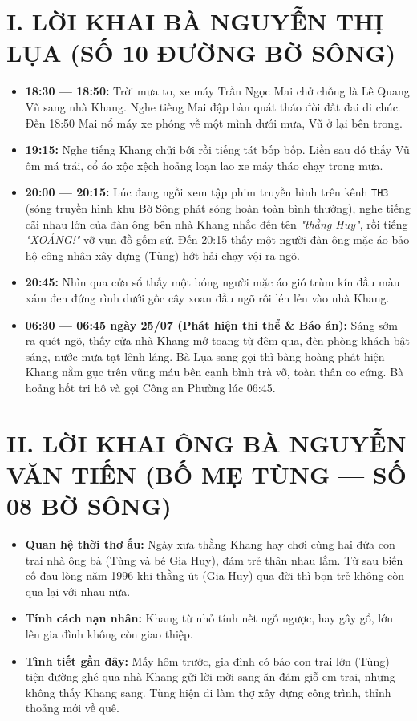 \documentclass[12pt,a4paper]{article}
\begin{document}
\section*{I. LỜI KHAI BÀ NGUYỄN THỊ LỤA (SỐ 10 ĐƯỜNG BỜ SÔNG)}
\begin{itemize}[leftmargin=1.5cm]
    \item \textbf{18:30 — 18:50:} Trời mưa to, xe máy Trần Ngọc Mai chở chồng là Lê Quang Vũ sang nhà Khang. Nghe tiếng Mai đập bàn quát tháo đòi đất đai di chúc. Đến 18:50 Mai nổ máy xe phóng về một mình dưới mưa, Vũ ở lại bên trong.
    \item \textbf{19:15:} Nghe tiếng Khang chửi bới rồi tiếng tát bốp bốp. Liền sau đó thấy Vũ ôm má trái, cổ áo xộc xệch hoảng loạn lao xe máy tháo chạy trong mưa.
    \item \textbf{20:00 — 20:15:} Lúc đang ngồi xem tập phim truyền hình trên kênh \texttt{TH3} (sóng truyền hình khu Bờ Sông phát sóng hoàn toàn bình thường), nghe tiếng cãi nhau lớn của đàn ông bên nhà Khang nhắc đến tên \textit{"thằng Huy"}, rồi tiếng \textit{"XOẢNG!"} vỡ vụn đồ gốm sứ. Đến 20:15 thấy một người đàn ông mặc áo bảo hộ công nhân xây dựng (Tùng) hớt hải chạy vội ra ngõ.
    \item \textbf{20:45:} Nhìn qua cửa sổ thấy một bóng người mặc áo gió trùm kín đầu màu xám đen đứng rình dưới gốc cây xoan đầu ngõ rồi lén lẻn vào nhà Khang.
    \item \textbf{06:30 — 06:45 ngày 25/07 (Phát hiện thi thể \& Báo án):} Sáng sớm ra quét ngõ, thấy cửa nhà Khang mở toang từ đêm qua, đèn phòng khách bật sáng, nước mưa tạt lênh láng. Bà Lụa sang gọi thì bàng hoàng phát hiện Khang nằm gục trên vũng máu bên cạnh bình trà vỡ, toàn thân co cứng. Bà hoảng hốt tri hô và gọi Công an Phường lúc 06:45.
\end{itemize}

\section*{II. LỜI KHAI ÔNG BÀ NGUYỄN VĂN TIẾN (BỐ MẸ TÙNG — SỐ 08 BỜ SÔNG)}
\begin{itemize}[leftmargin=1.5cm]
    \item \textbf{Quan hệ thời thơ ấu:} Ngày xưa thằng Khang hay chơi cùng hai đứa con trai nhà ông bà (Tùng và bé Gia Huy), đám trẻ thân nhau lắm. Từ sau biến cố đau lòng năm 1996 khi thằng út (Gia Huy) qua đời thì bọn trẻ không còn qua lại với nhau nữa.
    \item \textbf{Tính cách nạn nhân:} Khang từ nhỏ tính nết ngỗ ngược, hay gây gổ, lớn lên gia đình không còn giao thiệp.
    \item \textbf{Tình tiết gần đây:} Mấy hôm trước, gia đình có bảo con trai lớn (Tùng) tiện đường ghé qua nhà Khang gửi lời mời sang ăn đám giỗ em trai, nhưng không thấy Khang sang. Tùng hiện đi làm thợ xây dựng công trình, thỉnh thoảng mới về quê.
\end{itemize}
\end{document}
